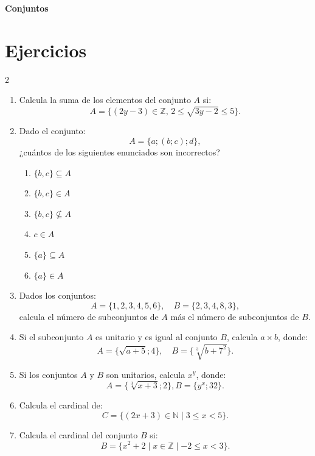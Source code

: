 \documentclass[10pt]{article}
\begin{document}
	\begin{center}
		\Large\bfseries Conjuntos
	\end{center}

	\section*{Ejercicios}
	\begin{multicols}{2}
		\begin{enumerate}[label=\textbf{\arabic*.}, itemsep=0.4cm]
			\item Calcula la suma de los elementos del conjunto $A$ si:
			\[
			A = \{ (2y - 3) \in \mathbb{Z}, \, 2 \leq \sqrt{3y - 2} \leq 5 \}.
			\]

			\item Dado el conjunto:
			\[
			A = \{a; (b;c); d\},
			\]
			¿cuántos de los siguientes enunciados son incorrectos?
			\begin{enumerate}[label=\Roman*.]
				\item $\{b, c\} \subseteq A$
				\item $\{b, c\} \in A$
				\item $\{b, c\} \not\subseteq A$
				\item $c \in A$
				\item $\{a\} \subseteq A$
				\item $\{a\} \in A$
			\end{enumerate}

			\item Dados los conjuntos:
			\[
			A = \{1, 2, 3, 4, 5, 6\}, \quad B = \{2, 3, 4, 8, 3\},
			\]
			calcula el número de subconjuntos de $A$ más el número de subconjuntos de $B$.

			\item Si el subconjunto $A$ es unitario y es igual al conjunto $B$, calcula $a \times b$, donde:
			\[
			A = \{\sqrt{a+5};4\}, \quad B = \{\sqrt[3]{b + 7^2}\} .
			\]

			\item Si los conjuntos $A$ y $B$ son unitarios, calcula $x^y$, donde:
			\[
			A = \{\sqrt[3]{x+3};2\}, B = \{y^x;32\}.
			\]

			\item Calcula el cardinal de:
			\[
			C = \{ (2x+3) \in \mathbb{N} \mid 3\leq x <  5 \}.
			\]

			\item Calcula el cardinal del conjunto $B$ si:
			\[
			B = \{ x^2 + 2 \mid x \in \mathbb{Z} \mid -2 \leq x < 3 \}.
			\]



\end{enumerate}
\end{multicols}
\end{document}
